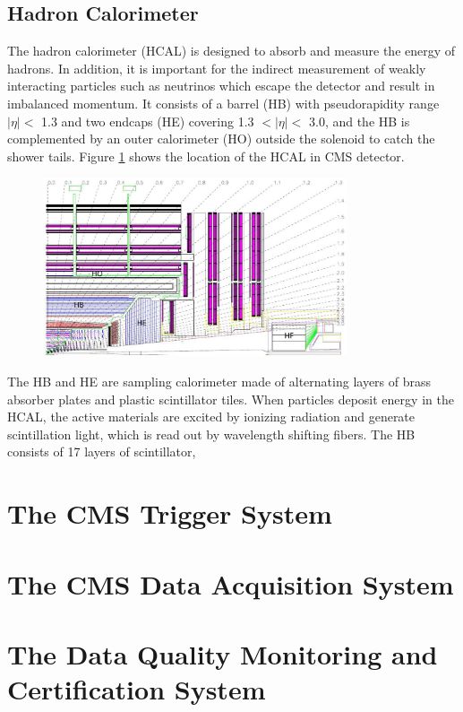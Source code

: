 \documentclass[thesis.tex]{subfiles}
\begin{document}
\subsection{Hadron Calorimeter}
The hadron calorimeter (HCAL) is designed to absorb and measure the energy of hadrons. 
In addition, it is important for the indirect measurement of weakly interacting particles such as neutrinos which escape the detector and result in imbalanced momentum.
It consists of a barrel (HB) with pseudorapidity range $|\eta| < $ 1.3 and two endcaps (HE) covering 1.3 $ < |\eta| <$ 3.0, and the HB is complemented by an outer calorimeter (HO) outside the solenoid to catch the shower tails. 
Figure \ref{fig:hcal} shows the location of the HCAL in CMS detector. 

\begin{figure}[hbtp]
	\centering
	\includegraphics[width=0.8\textwidth]{plot/hcal.png}
	\label{fig:hcal}
\end{figure}

The HB and HE are sampling calorimeter made of alternating layers of brass absorber plates and plastic scintillator tiles.
When particles deposit energy in the HCAL, the active materials are excited by ionizing radiation and generate scintillation light, which is read out by wavelength shifting fibers. 
The HB consists of 17 layers of scintillator, 



\section{The CMS Trigger System}

\section{The CMS Data Acquisition System}

\section{The Data Quality Monitoring and Certification System}
\end{document}
